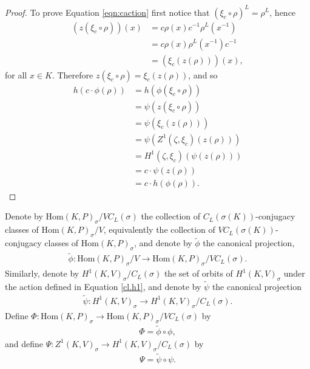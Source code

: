 \begin{proof}
		To prove Equation \ref{eqn:caction} first notice that $\left(\xi_c \circ \rho\right)^L = \rho^L$, hence
		\begin{align*}
			(z(\xi_c \circ \rho))(x) &= c\rho(x)c^{-1}\rho^L(x^{-1}) \\
				&= c\rho(x)\rho^L(x^{-1})c^{-1} \\
				&= \left(\xi_c ( z(\rho))\right)(x),
		\end{align*}
		for all $x \in K$. Therefore $z\left(\xi_c \circ \rho\right) = \xi_c\left(z(\rho)\right)$, and so
		\begin{align*}
			h(c \cdot \phi(\rho)) &= h(\phi(\xi_c \circ \rho)) \\
			&= \psi(z(\xi_c\circ\rho)) \\
			&= \psi(\xi_c(z(\rho))) \\
			&= \psi\left(Z^1(\zeta, \xi_c)(z(\rho))\right) \\
			&= H^1(\zeta, \xi_c)(\psi(z(\rho))) \\
			&= c \cdot \psi(z(\rho)) \\
			&= c \cdot h(\phi(\rho)).
		\end{align*}
\end{proof}
	\begin{definition}
		Denote by $\mathrm{Hom}(K, P)_\sigma/VC_L(\sigma)$ the collection of $C_L(\sigma(K))$-conjugacy classes of $\mathrm{Hom}(K, P)_\sigma/V$, equivalently the collection of $VC_L(\sigma(K))$-conjugacy classes of $\mathrm{Hom}(K, P)_\sigma$, and denote by $\widetilde{\phi}$ the canonical projection,
		\begin{align*}
			\widetilde{\phi}: \mathrm{Hom}(K, P)_\sigma/V \rightarrow \mathrm{Hom}(K, P)_\sigma/VC_L(\sigma).
		\end{align*}
		Similarly, denote by $H^1(K, V)_\sigma/C_L(\sigma)$ the set of orbits of $H^1(K, V)_\sigma$ under the action defined in Equation \ref{cl.h1}, and denote by $\widetilde{\psi}$ the canonical projection
		\begin{align*}
			\widetilde{\psi}:H^1(K, V)_\sigma \rightarrow H^1(K, V)_\sigma/C_L(\sigma).
		\end{align*}
	Define $\Phi:\mathrm{Hom}(K, P)_\sigma \rightarrow \mathrm{Hom}(K, P)_\sigma/VC_L(\sigma)$ by
	\begin{align*}
		\Phi = \widetilde{\phi} \circ \phi,
	\end{align*}
	and define $\Psi:Z^1(K, V)_\sigma \rightarrow H^1(K, V)_\sigma/C_L(\sigma)$ by
	\begin{align*}
		\Psi = \widetilde{\psi} \circ \psi.
	\end{align*}
	\end{definition}

